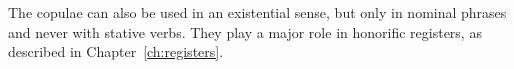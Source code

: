 \documentclass[grammar]{subfiles}
\begin{document}

  The copulae can also be used in an existential sense, but only in nominal phrases and never with stative verbs. They play a major role in honorific registers, as described in Chapter~\ref{ch:registers}.
\end{document}
